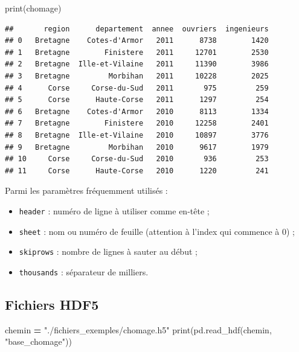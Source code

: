 \documentclass[
  12pt,
]{book}
\newenvironment{Shaded}{\begin{snugshade}}{\end{snugshade}}
\newcommand{\BuiltInTok}[1]{#1}
\newcommand{\NormalTok}[1]{#1}
\newcommand{\OperatorTok}[1]{\textcolor[rgb]{0.81,0.36,0.00}{\textbf{#1}}}
\newcommand{\StringTok}[1]{\textcolor[rgb]{0.31,0.60,0.02}{#1}}
\providecommand{\tightlist}{%
  \setlength{\itemsep}{0pt}\setlength{\parskip}{0pt}}
\numberwithin{equation}{section}
\numberwithin{countremarque}{section}
\begin{document}
\begin{Shaded}
\begin{Highlighting}[]
\BuiltInTok{print}\NormalTok{(chomage)}
\end{Highlighting}
\end{Shaded}

\begin{lstlisting}
##       region      departement  annee  ouvriers  ingenieurs
## 0   Bretagne    Cotes-d'Armor   2011      8738        1420
## 1   Bretagne        Finistere   2011     12701        2530
## 2   Bretagne  Ille-et-Vilaine   2011     11390        3986
## 3   Bretagne         Morbihan   2011     10228        2025
## 4      Corse     Corse-du-Sud   2011       975         259
## 5      Corse      Haute-Corse   2011      1297         254
## 6   Bretagne    Cotes-d'Armor   2010      8113        1334
## 7   Bretagne        Finistere   2010     12258        2401
## 8   Bretagne  Ille-et-Vilaine   2010     10897        3776
## 9   Bretagne         Morbihan   2010      9617        1979
## 10     Corse     Corse-du-Sud   2010       936         253
## 11     Corse      Haute-Corse   2010      1220         241
\end{lstlisting}

Parmi les paramètres fréquemment utilisés :

\begin{itemize}
\tightlist
\item
  \texttt{header} : numéro de ligne à utiliser comme en-tête ;
\item
  \texttt{sheet} : nom ou numéro de feuille (attention à l'index qui commence à 0) ;
\item
  \texttt{skiprows} : nombre de lignes à sauter au début ;
\item
  \texttt{thousands} : séparateur de milliers.
\end{itemize}

\subsection{Fichiers HDF5}\label{pandas-importation-hdf}

\begin{Shaded}
\begin{Highlighting}[]
\NormalTok{chemin }\OperatorTok{=} \StringTok{"./fichiers\_exemples/chomage.h5"}
\BuiltInTok{print}\NormalTok{(pd.read\_hdf(chemin, }\StringTok{"base\_chomage"}\NormalTok{))}
\end{Highlighting}
\end{Shaded}
\end{document}
